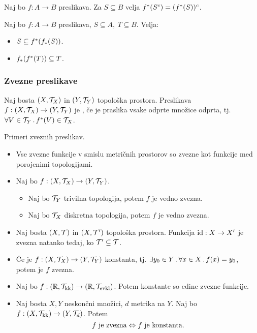 \begin{trditev}
    Naj bo $f: A \to B$ preslikava. Za $S \subseteq B$ velja $f^{*}(S^c) = (f^{*}(S))^c$.
\end{trditev}

\begin{trditev}
    Naj bo $f: A \to B$ preslikava, $S \subseteq A, \ T \subseteq B$. Velja:
    \begin{itemize}
        \item $S \subseteq f^{*}(f_{*}(S))$.
        \item $f_{*}(f^{*}(T)) \subseteq T$.
    \end{itemize}
\end{trditev}

\subsubsection{Zvezne preslikave}
\begin{definicija}    
    Naj bosta $(X, \mathcal{T}_X)$ in $(Y, \mathcal{T}_Y)$ topološka prostora. Preslikava $f: (X, \mathcal{T}_X) \to (Y, \mathcal{T}_Y)$ je , če je praslika vsake odprte množice odprta, tj. $\forall V \in \mathcal{T}_Y \,.\, f^{*}(V) \in \mathcal{T}_X$.
\end{definicija}

\begin{primer}
    Primeri zveznih preslikav.
    \begin{itemize}
        \item Vse zvezne funkcije v smislu metričnih prostorov so zvezne kot funkcije med porojenimi topologijami.
        \item Naj bo $f: (X, \mathcal{T}_X) \to (Y, \mathcal{T}_Y)$. 
        \begin{itemize}
            \item Naj bo $\mathcal{T}_Y$ trivilna topologija, potem $f$ je vedno zvezna.
            \item Naj bo $\mathcal{T}_X$ diskretna topologija, potem $f$ je vedno zvezna.
        \end{itemize}
        \item Naj bosta $(X, \mathcal{T})$ in $(X, \mathcal{T}')$ topološka prostora. Funkcija $\operatorname{id}: X \to X'$ je zvezna natanko tedaj, ko $\mathcal{T}' \subseteq \mathcal{T}$.
        \item Če je $f: (X, \mathcal{T}_X) \to (Y, \mathcal{T}_Y)$ konstanta, tj. $\exists y_0 \in Y \,.\, \forall x \in X \,.\, f(x) = y_0$, potem je $f$ zvezna.
        \item Naj bo $f: (\mathbb{R}, \mathcal{T}_{\text{kk}}) \to (\mathbb{R}, \mathcal{T}_{\text{evkl}})$. Potem konstante so edine zvezne funkcije.         
        \item Naj bosta $X, Y$ neskončni množici, $d$ metrika na $Y$. Naj bo $f: (X, \mathcal{T}_{\text{kk}}) \to (Y, \mathcal{T}_d)$. Potem 
        $$f \text{ je zvezna} \Leftrightarrow f \text{ je konstanta}.$$
    \end{itemize}
\end{primer}

